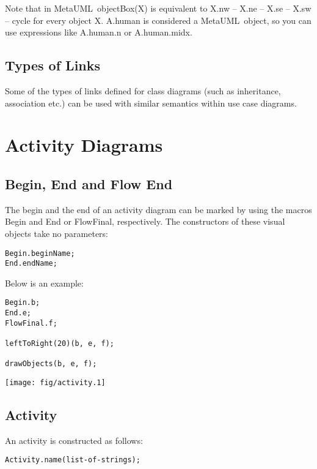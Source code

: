 \documentclass{article}
\newcommand{\code}{\ttfamily}
\newcommand{\metauml}{MetaUML}
\begin{document}
Note that in \metauml\ {\code objectBox(X)} is equivalent to {\code X.nw -- X.ne -- X.se -- X.sw -- cycle} for every object {\code X}. {\code A.human} is considered a \metauml\ object, so you can use expressions like {\code A.human.n} or {\code A.human.midx}.

\subsection{Types of Links}

Some of the types of links defined for class diagrams (such as inheritance, association etc.) can be used with similar semantics within use case diagrams.

\section{Activity Diagrams}

\subsection{Begin, End and Flow End}

The begin and the end of an activity diagram can be marked by using the macros {\code Begin}
and {\code End} or {\code FlowFinal}, respectively. The constructors of these visual objects take no parameters:

\begin{verbatim}
Begin.beginName;
End.endName;
\end{verbatim}

Below is an example:

\begin{multicols}{2}
\begin{verbatim}
Begin.b;
End.e;
FlowFinal.f;

leftToRight(20)(b, e, f);

drawObjects(b, e, f);
\end{verbatim}
\columnbreak
\hspace{1cm}\texttt{[image: fig/activity.1]}
\end{multicols}

\subsection{Activity}

An activity is constructed as follows:
\begin{verbatim}
Activity.name(list-of-strings);
\end{verbatim}
\end{document}
